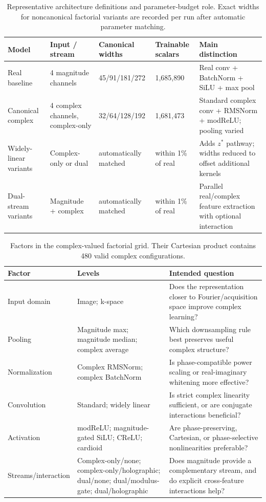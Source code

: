 \documentclass[journal]{IEEEtran}
\begin{document}
\begin{table}[t]
\centering
\caption{Representative architecture definitions and parameter-budget role. Exact widths for noncanonical factorial variants are recorded per run after automatic parameter matching.}
\label{tab:architectures}
\scriptsize
\begin{tabularx}{\textwidth}{L{3.0cm}L{3.2cm}L{2.8cm}L{2.5cm}X}
\toprule
Model & Input / stream & Canonical widths & Trainable scalars & Main distinction \\
\midrule
Real baseline & 4 magnitude channels & 45/91/181/272 & 1,685,890 & Real conv + BatchNorm + SiLU + max pool \\
Canonical complex & 4 complex channels, complex-only & 32/64/128/192 & 1,681,473 & Standard complex conv + RMSNorm + modReLU; pooling varied \\
Widely-linear variants & Complex-only or dual & automatically matched & within 1\% of real & Adds $z^*$ pathway; widths reduced to offset additional kernels \\
Dual-stream variants & Magnitude + complex & automatically matched & within 1\% of real & Parallel real/complex feature extraction with optional interaction \\
\bottomrule
\end{tabularx}
\end{table}

\begin{table}[t]
\centering
\caption{Factors in the complex-valued factorial grid. Their Cartesian product contains 480 valid complex configurations.}
\label{tab:grid}
\scriptsize
\begin{tabularx}{\textwidth}{L{2.9cm}L{4.2cm}X}
\toprule
Factor & Levels & Intended question \\
\midrule
Input domain & Image; k-space & Does the representation closer to Fourier/acquisition space improve complex learning? \\
Pooling & Magnitude max; magnitude median; complex average & Which downsampling rule best preserves useful complex structure? \\
Normalization & Complex RMSNorm; complex BatchNorm & Is phase-compatible power scaling or real-imaginary whitening more effective? \\
Convolution & Standard; widely linear & Is strict complex linearity sufficient, or are conjugate interactions beneficial? \\
Activation & modReLU; magnitude-gated SiLU; CReLU; cardioid & Are phase-preserving, Cartesian, or phase-selective nonlinearities preferable? \\
Streams/interaction & Complex-only/none; complex-only/holographic; dual/none; dual/modulus-gate; dual/holographic & Does magnitude provide a complementary stream, and do explicit cross-feature interactions help? \\
\bottomrule
\end{tabularx}
\end{table}
\end{document}
